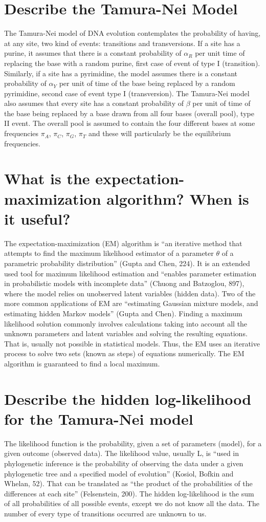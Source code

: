 \documentclass[12pt,twoside]{article}
\begin{document}
\section{Describe the Tamura-Nei Model}
The Tamura-Nei model of DNA evolution contemplates the probability of having, at any site, two kind of events: transitions and transversions. If a site has a purine, it assumes that there is a constant probability of $\alpha_{R}$ per unit time of replacing the base with a random purine, first case of event of type I (transition). Similarly, if a site has a pyrimidine, the model assumes there is a constant probability of $\alpha_{Y}$ per unit of time of the base being replaced by a random pyrimidine, second case of event type I (transversion). The Tamura-Nei model also assumes that every site has a constant probability of $\beta$ per unit of time of the base being replaced by a base drawn from all four bases (overall pool), type II event. The overall pool is assumed to contain the four different bases at some frequencies $\pi_{A}$, $\pi_{C}$, $\pi_{G}$, $\pi_{T}$ and these will particularly be the equilibrium frequencies.

\section{What is the expectation-maximization algorithm? When is it useful?}
The expectation-maximization (EM) algorithm is “an iterative method that attempts to find the maximum likelihood estimator of a parameter $\theta$ of a parametric probability distribution” (Gupta and Chen, 224). It is an extended used tool for maximum likelihood estimation and “enables parameter estimation in probabilistic models with incomplete data” (Chuong and Batzoglou, 897), where the model relies on unobserved latent variables (hidden data). Two of the more common applications of EM are “estimating Gaussian mixture models, and estimating hidden Markov models” (Gupta and Chen).
Finding a maximum likelihood solution commonly involves calculations taking into account all the unknown parameters and latent variables and solving the resulting equations. That is, usually not possible in statistical models. Thus, the EM uses an iterative process to solve two sets (known as steps) of equations numerically. The EM algorithm is guaranteed to find a local maximum.

\section{Describe the hidden log-likelihood for the Tamura-Nei model}
The likelihood function is the probability, given a set of parameters (model), for a given outcome (observed data). The likelihood value, usually L, is “used in phylogenetic inference is the probability of observing the data under a given phylogenetic tree and a specified model of evolution” (Kosiol, Bofkin and Whelan, 52). That can be translated as “the product of the probabilities of the differences at each site” (Felsenstein, 200).
The hidden log-likelihood is the sum of all probabilities of all possible events, except we do not know all the data. The number of every type of transitions occurred are unknown to us.
\end{document}
